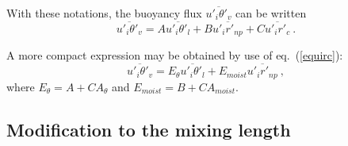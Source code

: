 With these notations, the buoyancy flux
$\overline{{u'_{i}}{{\theta}'_{v}}}$ can be written
\begin{equation}\label{eqn:u'itheta'v}
\overline{{u'_{i}}{{\theta}'_{v}}} = A \overline{{u'_{i}}{{\theta}'_{l}}} +
B \overline{{u'_{i}}{r'_{np}}} + C \overline{{u'_{i}}{r'_{c}}}~.
\end{equation}

A more compact expression may be obtained by use of eq.~(\ref{equirc}):
\begin{equation} \label{ErEtheta}
\overline{{u'_{i}}{{\theta}'_{v}}} = E_{\theta} \overline{{u'_{i}}{{\theta}'_{l}}} +
E_{moist} \overline{{u'_{i}}{r'_{np}}}~,
\end{equation}
where $E_{\theta} = A + C A_{\theta}$ and $E_{moist} = B + C A_{moist}$.


\subsection{Modification to the mixing length}




